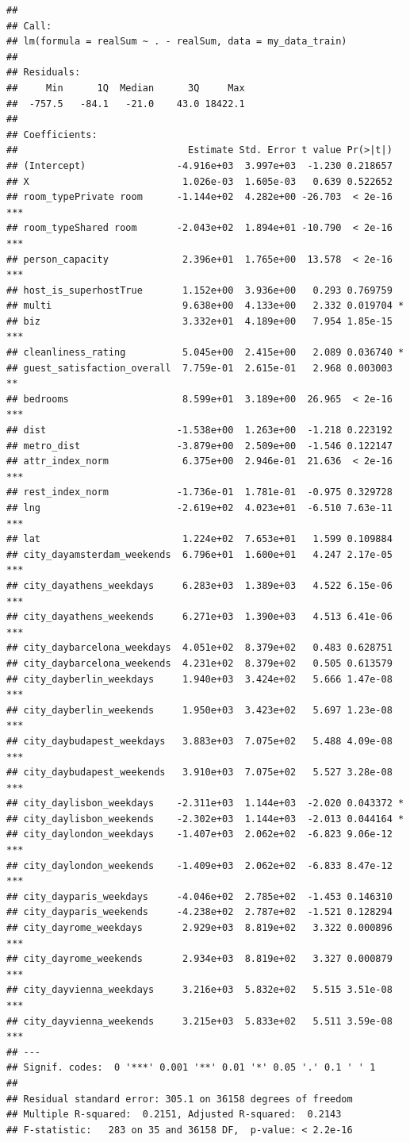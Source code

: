 \documentclass[
]{article}
\begin{document}
\begin{verbatim}
## 
## Call:
## lm(formula = realSum ~ . - realSum, data = my_data_train)
## 
## Residuals:
##     Min      1Q  Median      3Q     Max 
##  -757.5   -84.1   -21.0    43.0 18422.1 
## 
## Coefficients:
##                              Estimate Std. Error t value Pr(>|t|)    
## (Intercept)                -4.916e+03  3.997e+03  -1.230 0.218657    
## X                           1.026e-03  1.605e-03   0.639 0.522652    
## room_typePrivate room      -1.144e+02  4.282e+00 -26.703  < 2e-16 ***
## room_typeShared room       -2.043e+02  1.894e+01 -10.790  < 2e-16 ***
## person_capacity             2.396e+01  1.765e+00  13.578  < 2e-16 ***
## host_is_superhostTrue       1.152e+00  3.936e+00   0.293 0.769759    
## multi                       9.638e+00  4.133e+00   2.332 0.019704 *  
## biz                         3.332e+01  4.189e+00   7.954 1.85e-15 ***
## cleanliness_rating          5.045e+00  2.415e+00   2.089 0.036740 *  
## guest_satisfaction_overall  7.759e-01  2.615e-01   2.968 0.003003 ** 
## bedrooms                    8.599e+01  3.189e+00  26.965  < 2e-16 ***
## dist                       -1.538e+00  1.263e+00  -1.218 0.223192    
## metro_dist                 -3.879e+00  2.509e+00  -1.546 0.122147    
## attr_index_norm             6.375e+00  2.946e-01  21.636  < 2e-16 ***
## rest_index_norm            -1.736e-01  1.781e-01  -0.975 0.329728    
## lng                        -2.619e+02  4.023e+01  -6.510 7.63e-11 ***
## lat                         1.224e+02  7.653e+01   1.599 0.109884    
## city_dayamsterdam_weekends  6.796e+01  1.600e+01   4.247 2.17e-05 ***
## city_dayathens_weekdays     6.283e+03  1.389e+03   4.522 6.15e-06 ***
## city_dayathens_weekends     6.271e+03  1.390e+03   4.513 6.41e-06 ***
## city_daybarcelona_weekdays  4.051e+02  8.379e+02   0.483 0.628751    
## city_daybarcelona_weekends  4.231e+02  8.379e+02   0.505 0.613579    
## city_dayberlin_weekdays     1.940e+03  3.424e+02   5.666 1.47e-08 ***
## city_dayberlin_weekends     1.950e+03  3.423e+02   5.697 1.23e-08 ***
## city_daybudapest_weekdays   3.883e+03  7.075e+02   5.488 4.09e-08 ***
## city_daybudapest_weekends   3.910e+03  7.075e+02   5.527 3.28e-08 ***
## city_daylisbon_weekdays    -2.311e+03  1.144e+03  -2.020 0.043372 *  
## city_daylisbon_weekends    -2.302e+03  1.144e+03  -2.013 0.044164 *  
## city_daylondon_weekdays    -1.407e+03  2.062e+02  -6.823 9.06e-12 ***
## city_daylondon_weekends    -1.409e+03  2.062e+02  -6.833 8.47e-12 ***
## city_dayparis_weekdays     -4.046e+02  2.785e+02  -1.453 0.146310    
## city_dayparis_weekends     -4.238e+02  2.787e+02  -1.521 0.128294    
## city_dayrome_weekdays       2.929e+03  8.819e+02   3.322 0.000896 ***
## city_dayrome_weekends       2.934e+03  8.819e+02   3.327 0.000879 ***
## city_dayvienna_weekdays     3.216e+03  5.832e+02   5.515 3.51e-08 ***
## city_dayvienna_weekends     3.215e+03  5.833e+02   5.511 3.59e-08 ***
## ---
## Signif. codes:  0 '***' 0.001 '**' 0.01 '*' 0.05 '.' 0.1 ' ' 1
## 
## Residual standard error: 305.1 on 36158 degrees of freedom
## Multiple R-squared:  0.2151, Adjusted R-squared:  0.2143 
## F-statistic:   283 on 35 and 36158 DF,  p-value: < 2.2e-16
\end{verbatim}
\end{document}
